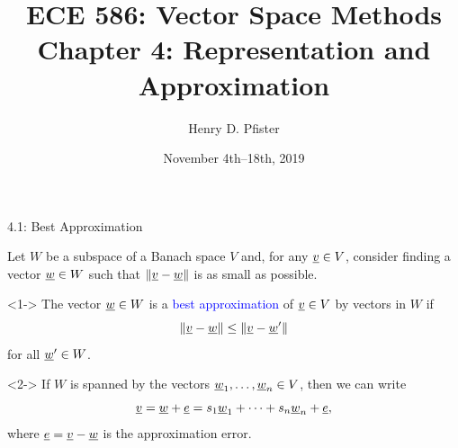\documentclass[10pt,letterpaper,english]{beamer}
\newif\ifslow
\begin{document}
\ifslow

\title{ECE 586: Vector Space Methods \\ Chapter 4: Representation and Approximation}
\author{Henry D. Pfister \\ \univ}
\date{November 4th--18th, 2019}
\maketitle

\begin{frame}{4.1: Best Approximation}

Let $W$ be a subspace of a Banach space $V$ and, for any $\underline{v} \in V$, consider finding a vector $\underline{w} \in W$ such that $\left\| \underline{v} - \underline{w} \right\|$ is as small as possible.
\begin{definition}<1->
The vector $\underline{w} \in W$ is a \textcolor{blue}{best approximation} of $\underline{v} \in V$ by vectors in $W$ if
\begin{equation*}
\left\| \underline{v} - \underline{w} \right\| \leq \left\| \underline{v} - \underline{w}' \right\|
\end{equation*}
for all $\underline{w}' \in W$.
\end{definition}

\begin{example}<2->
If $W$ is spanned by the vectors $\underline{w}_1, \ldots, \underline{w}_n \in V$, then we can write
\begin{equation*}
\underline{v} = \underline{w} + \underline{e} = s_1 \underline{w}_1 + \cdots + s_n \underline{w}_n + \underline{e},
\end{equation*}
where $\underline{e} = \underline{v}-\underline{w}$ is the approximation error.
\end{example}
\end{frame}
\end{document}
